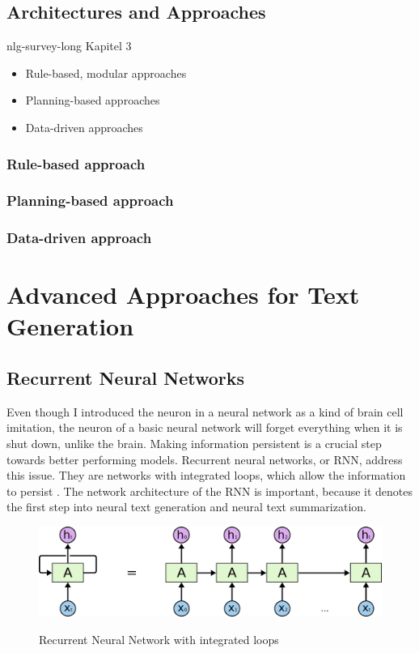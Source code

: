 \subsection{Architectures and Approaches}


nlg-survey-long Kapitel 3

\begin{itemize}
	\item Rule-based, modular approaches
	\item Planning-based approaches
	\item Data-driven approaches
\end{itemize}

\subsubsection{Rule-based approach}
\subsubsection{Planning-based approach}
\subsubsection{Data-driven approach}




\section{Advanced Approaches for Text Generation}


\subsection{Recurrent Neural Networks}
Even though I introduced the neuron in a neural network as a kind of brain cell imitation, the neuron of a basic neural network will forget everything when it is shut down, unlike the brain. Making information persistent is a crucial step towards better performing models. Recurrent neural networks, or RNN, address this issue. They are networks with integrated loops, which allow the information to persist \cite{olah}. The network architecture of the RNN is important, because it denotes the first step into neural text generation and neural text summarization. 

\begin{figure}
	\begin{center}
		\includegraphics[width=4.5in]{photos/RNN-unrolled}\\
		\caption{Recurrent Neural Network with integrated loops \cite{olah}}\label{rnn}
	\end{center}
\end{figure}

